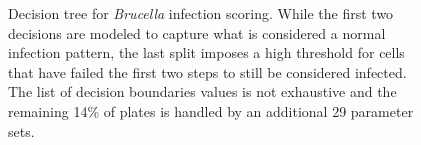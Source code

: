 \renewcommand{\arraystretch}{1.5}
\setlength{\tabcolsep}{0.38em}
\begin{figure}[t!]
  \centering

  \vspace{5mm}
  \footnotesize
  

  \vspace{5mm}
  \caption[Decision tree for \textit{Brucella} infection scoring.]{Decision tree for \textit{Brucella} infection scoring. While the first two decisions are modeled to capture what is considered a normal infection pattern, the last split imposes a high threshold for cells that have failed the first two steps to still be considered infected. The list of decision boundaries values is not exhaustive and the remaining 14\% of plates is handled by an additional 29 parameter sets.}
\end{figure}

